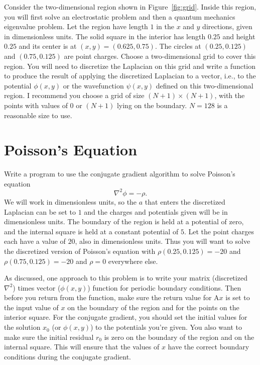 

Consider the two-dimensional region shown in Figure~\ref{fig:grid}.
Inside this region, you will first
solve an electrostatic problem and then a quantum mechanics eigenvalue problem. Let the
region have length \(1\) in the \(x\) and \(y\) directions, given in dimensionless units.
The solid square in the interior has length \(0.25\) and height \(0.25\) and its center is
at \((x, y) = (0.625, 0.75)\). The circles at \((0.25, 0.125)\) and \((0.75, 0.125)\) are
point charges. Choose a two-dimensional grid to cover this region. You will need to
discretize the Laplacian on this grid and write a function to produce the result of applying
the discretized Laplacian to a vector, i.e., to the potential \(\phi(x, y)\) or the
wavefunction \(\psi(x, y)\) defined on this two-dimensional region. I recommend you choose a
grid of size \((N + 1) \times (N + 1)\), with the points with values of \(0\) or \((N + 1)\)
lying on the boundary. \(N = 128\) is a reasonable size to use.

\section{Poisson's Equation}\label{sec:pe}

Write a program to use the conjugate gradient algorithm to solve Poisson's equation
%
\begin{equation}\label{eq:poisson}
    \nabla^2 \phi = -\rho.
\end{equation}
%
We will work in dimensionless units, so the \(a\) that enters the discretized Laplacian can be
set to \(1\) and the charges and potentials given will be in dimensionless units. The
boundary of the region is held at a potential of zero, and the internal square is held at a
constant potential of \(5\). Let the point charges each have a value of \(20\), also in
dimensionless units. Thus you will want to solve the discretized version of Poisson's
equation with \(\rho(0.25, 0.125) = -20\) and \(\rho(0.75, 0.125) = -20\) and \(\rho = 0\)
everywhere else.

As discussed, one approach to this problem is to write your matrix
(discretized \(\nabla^2\)) times vector (\(\phi(x, y)\)) function for periodic boundary
conditions. Then before you return from the function, make sure the return value for
\(\mathrm{ A } x\) is set to the input value of \(x\) on the boundary of the region and for
the points on the interior square. For the conjugate gradient, you should set the initial
values for the solution \(x_0\) (or \(\phi(x, y)\)) to the potentials you're given. You also
want to make sure the initial residual \(r_0\) is zero on the boundary of the region and on
the internal square. This will ensure that the values of \(x\) have the correct boundary
conditions during the conjugate gradient.

